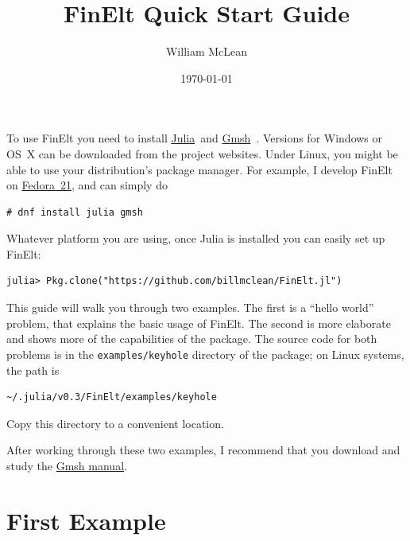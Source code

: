 \documentclass[a4paper,12pt]{article}
\title{FinElt Quick Start Guide}
\author{William McLean}
\date{\today}
\begin{document}
\maketitle
To use FinElt you need to install \href{www.julialan.org}{Julia}~and 
\href{www.geuz.org/gmsh/}{Gmsh}~\cite{Gmsh}.  Versions for Windows or 
OS~X can be downloaded from the project websites.  Under Linux, you
might be able to use your distribution's package manager.  For 
example, I develop FinElt on \href{www.fedoraproject.org}{Fedora~21}, 
and can simply do
\begin{verbatim}
# dnf install julia gmsh 
\end{verbatim}

Whatever platform you are using, once Julia is installed you can 
easily set up FinElt:
\begin{verbatim}
julia> Pkg.clone("https://github.com/billmclean/FinElt.jl")
\end{verbatim}
This guide will walk you through two examples.  The first is a 
``hello world'' problem, that explains the basic usage of FinElt.
The second is more elaborate and shows more of the capabilities of 
the package.  The source code for both problems is in the 
\texttt{examples/keyhole} directory of the package; on Linux systems, 
the path is
\begin{verbatim}
~/.julia/v0.3/FinElt/examples/keyhole
\end{verbatim}
Copy this directory to a convenient location.

After working through these two examples, I recommend that you 
download and study the 
\href{http://www.geuz.org/gmsh/doc/texinfo/gmsh.pdf}{Gmsh manual}.
\section*{First Example}
\end{document}
